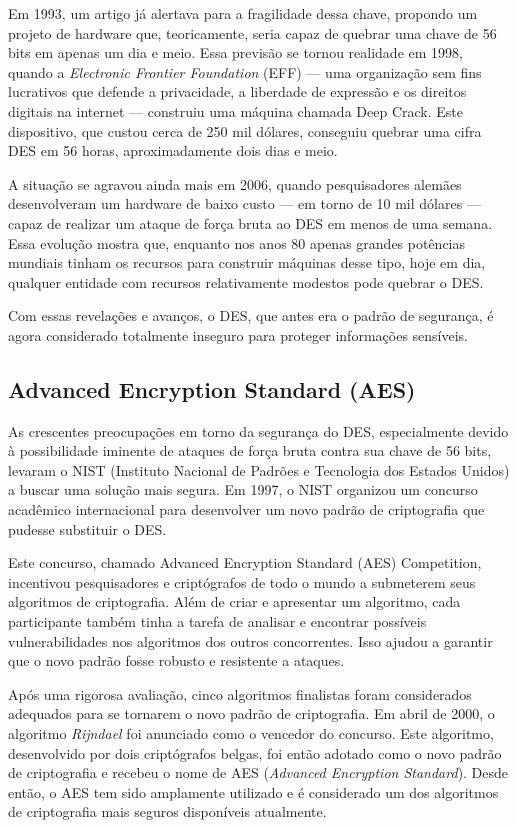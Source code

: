 Em 1993, um artigo já alertava para a fragilidade dessa chave, propondo um projeto de hardware que, teoricamente, seria capaz de quebrar uma chave de 56 bits em apenas um dia e meio.
Essa previsão se tornou realidade em 1998, quando a {\em Electronic Frontier Foundation} (EFF)  — uma organização sem fins lucrativos que defende a privacidade, a liberdade de expressão e os direitos digitais na internet — construiu uma máquina chamada Deep Crack.
Este dispositivo, que custou cerca de 250 mil dólares, conseguiu quebrar uma cifra DES em 56 horas, aproximadamente dois dias e meio.

A situação se agravou ainda mais em 2006, quando pesquisadores alemães desenvolveram um hardware de baixo custo — em torno de 10 mil dólares — capaz de realizar um ataque de força bruta ao DES em menos de uma semana.
Essa evolução mostra que, enquanto nos anos 80 apenas grandes potências mundiais tinham os recursos para construir máquinas desse tipo, hoje em dia, qualquer entidade com recursos relativamente modestos pode quebrar o DES.

Com essas revelações e avanços, o DES, que antes era o padrão de segurança, é agora considerado totalmente inseguro para proteger informações sensíveis.

\subsection{Advanced Encryption Standard (AES)}
\label{sec:aes}

As crescentes preocupações em torno da segurança do DES, especialmente devido à possibilidade iminente de ataques de força bruta contra sua chave de 56 bits, levaram o NIST (Instituto Nacional de Padrões e Tecnologia dos Estados Unidos) a buscar uma solução mais segura.
Em 1997, o NIST organizou um concurso acadêmico internacional para desenvolver um novo padrão de criptografia que pudesse substituir o DES.

Este concurso, chamado Advanced Encryption Standard (AES) Competition, incentivou pesquisadores e criptógrafos de todo o mundo a submeterem seus algoritmos de criptografia.
Além de criar e apresentar um algoritmo, cada participante também tinha a tarefa de analisar e encontrar possíveis vulnerabilidades nos algoritmos dos outros concorrentes.
Isso ajudou a garantir que o novo padrão fosse robusto e resistente a ataques.

Após uma rigorosa avaliação, cinco algoritmos finalistas foram considerados adequados para se tornarem o novo padrão de criptografia.
Em abril de 2000, o algoritmo {\em Rijndael} foi anunciado como o vencedor do concurso.
Este algoritmo, desenvolvido por dois criptógrafos belgas, foi então adotado como o novo padrão de criptografia e recebeu o nome de AES ({\em Advanced Encryption Standard}).
Desde então, o AES tem sido amplamente utilizado e é considerado um dos algoritmos de criptografia mais seguros disponíveis atualmente.

